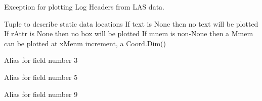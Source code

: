 \documentclass[letterpaper,10pt,english]{sphinxmanual}
\begin{document}

\begin{fulllineitems}
\label{\detokenize{ref/util/plot/LogHeader:TotalDepth.util.plot.LogHeader.ExceptionLogHeaderLAS}}
Exception for plotting Log Headers from LAS data.

\end{fulllineitems}


\begin{fulllineitems}
\label{\detokenize{ref/util/plot/LogHeader:TotalDepth.util.plot.LogHeader.Static}}
Tuple to describe static data locations
If text is None then no text will be plotted
If rAttr is None then no box will be plotted
If mnem is non-None then a Mmem can be plotted at xMenm increment, a Coord.Dim()

\begin{fulllineitems}
\label{\detokenize{ref/util/plot/LogHeader:TotalDepth.util.plot.LogHeader.Static.d}}
Alias for field number 3

\end{fulllineitems}


\begin{fulllineitems}
\label{\detokenize{ref/util/plot/LogHeader:TotalDepth.util.plot.LogHeader.Static.font}}
Alias for field number 5

\end{fulllineitems}


\begin{fulllineitems}
\label{\detokenize{ref/util/plot/LogHeader:TotalDepth.util.plot.LogHeader.Static.mnem}}
Alias for field number 9

\end{fulllineitems}


\end{fulllineitems}
\end{document}
